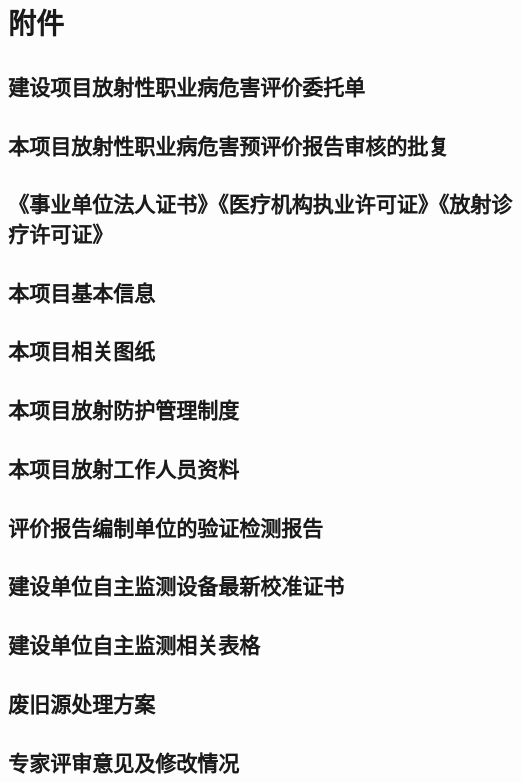 \clearpage


\renewcommand{\thechapter}{}
\setcounter{chapter}{0}
\renewcommand{\thesection}{附件\arabic{section}}
\setcounter{section}{0}

\chapter*{附件}

\section{建设项目放射性职业病危害评价委托单}

\section{本项目放射性职业病危害预评价报告审核的批复}

\section{《事业单位法人证书》《医疗机构执业许可证》《放射诊疗许可证》}

\section{本项目基本信息}

\section{本项目相关图纸}

\section{本项目放射防护管理制度}

\section{本项目放射工作人员资料}

\section{评价报告编制单位的验证检测报告}

\section{建设单位自主监测设备最新校准证书}

\section{建设单位自主监测相关表格}

\section{废旧源处理方案}

\section{专家评审意见及修改情况}

